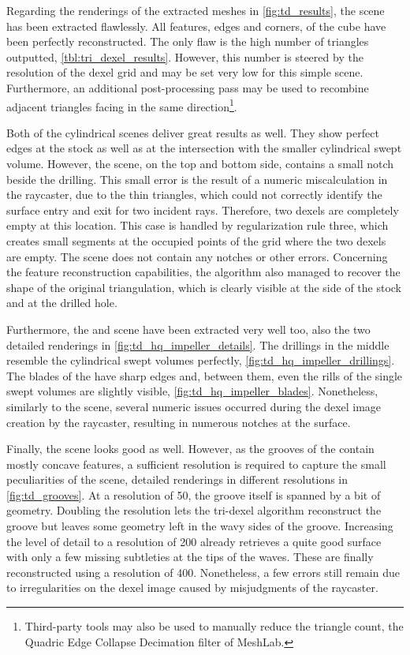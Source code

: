 Regarding the renderings of the extracted meshes in \cref{fig:td_results}, the \cubes scene has been extracted flawlessly.
All features, \ie edges and corners, of the cube have been perfectly reconstructed.
The only flaw is the high number of triangles outputted, \cf \cref{tbl:tri_dexel_results}. %
However, this number is steered by the resolution of the dexel grid and may be set very low for this simple scene.
Furthermore, an additional post-processing pass may be used to recombine adjacent triangles facing in the same direction\footnote{Third-party tools may also be used to manually reduce the triangle count, \eg the Quadric Edge Collapse Decimation filter of MeshLab.}.

Both of the cylindrical scenes deliver great results as well.
They show perfect edges at the stock as well as at the intersection with the smaller cylindrical swept volume.
However, the \cylinders scene, on the top and bottom side, contains a small notch beside the drilling.
This small error is the result of a numeric miscalculation in the raycaster, due to the thin triangles, which could not correctly identify the surface entry and exit for two incident rays.
Therefore, two dexels are completely empty at this location.
This case is handled by regularization rule three, which creates small segments at the occupied points of the grid where the two dexels are empty.
The \cylindersd scene does not contain any notches or other errors.
Concerning the feature reconstruction capabilities, the algorithm also managed to recover the shape of the original triangulation, which is clearly visible at the side of the stock and at the drilled hole.

Furthermore, the \impeller and \impellerhalf scene have been extracted very well too, \cf also the two detailed renderings in \cref{fig:td_hq_impeller_details}.
The drillings in the middle resemble the cylindrical swept volumes perfectly, \cf \cref{fig:td_hq_impeller_drillings}.
The blades of the \impeller have sharp edges and, between them, even the rills of the single swept volumes are slightly visible, \cf \cref{fig:td_hq_impeller_blades}.
Nonetheless, similarly to the \cylinders scene, several numeric issues occurred during the dexel image creation by the raycaster, resulting in numerous notches at the surface.

Finally, the \turbine scene looks good as well.
However, as the grooves of the \turbine contain mostly concave features, a sufficient resolution is required to capture the small peculiarities of the scene, \cf detailed renderings in different resolutions in \cref{fig:td_grooves}.
At a resolution of 50, the groove itself is spanned by a bit of geometry.
Doubling the resolution lets the tri-dexel algorithm reconstruct the groove but leaves some geometry left in the wavy sides of the groove.
Increasing the level of detail to a resolution of 200 already retrieves a quite good surface with only a few missing subtleties at the tips of the waves.
These are finally reconstructed using a resolution of 400.
Nonetheless, a few errors still remain due to irregularities on the dexel image caused by misjudgments of the raycaster.


